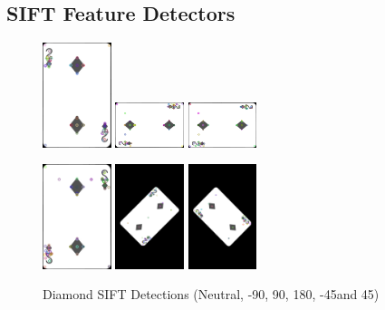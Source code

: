 \documentclass[conference]{IEEEtran}
\begin{document}
\subsection{SIFT Feature Detectors}
\begin{figure}[htbp]
    \centerline{
        {\includegraphics[width=20mm, scale=0.5]{./figures/SIFT/diamondNeutral SIFT.png}}
        {\includegraphics[width=20mm, scale=0.5]{./figures/SIFT/diamondDeg 90 SIFT.png}}
        {\includegraphics[width=20mm, scale=0.5]{./figures/SIFT/diamondDeg -90 SIFT.png}}
    }
    \centerline{
        {\includegraphics[width=20mm, scale=0.5]{./figures/SIFT/diamond180 Deg SIFT.png}}
        {\includegraphics[width=20mm, scale=0.5]{./figures/SIFT/diamondDeg -45 SIFT.png}}
        {\includegraphics[width=20mm, scale=0.5]{./figures/SIFT/diamondDeg 45 SIFT.png}}
    }
    \caption{Diamond SIFT Detections (Neutral, -90\degree, 90\degree, 180\degree, -45\degree and 45\degree)}
    \label{fig}
\end{figure}
\end{document}

